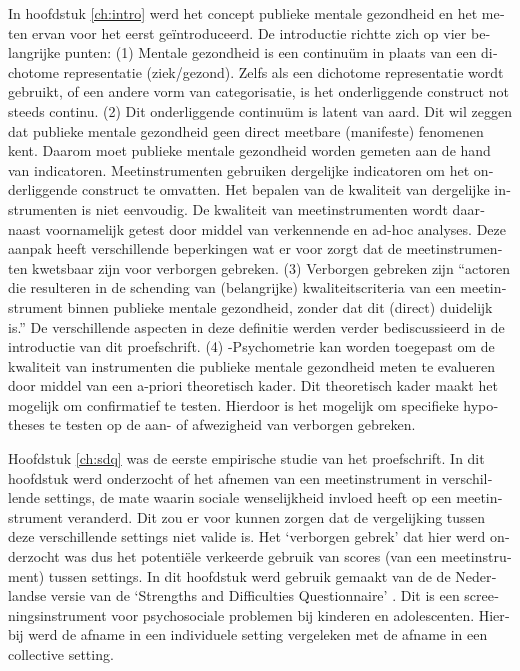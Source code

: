 \begin{otherlanguage}{dutch}
In hoofdstuk \ref{ch:intro} werd het concept publieke mentale gezondheid en het meten ervan voor het eerst ge\"introduceerd. De introductie richtte zich op vier belangrijke punten: (1) Mentale gezondheid is een continu\"um in plaats van een dichotome representatie (ziek/gezond). Zelfs als een dichotome representatie wordt gebruikt, of een andere vorm van categorisatie, is het onderliggende construct not steeds continu. (2) Dit onderliggende continu\"um is latent van aard. Dit wil zeggen dat publieke mentale gezondheid geen direct meetbare (manifeste) fenomenen kent. Daarom moet publieke mentale gezondheid worden gemeten aan de hand van indicatoren. Meetinstrumenten gebruiken dergelijke indicatoren om het onderliggende construct te omvatten. Het bepalen van de kwaliteit van dergelijke instrumenten is niet eenvoudig. De kwaliteit van meetinstrumenten wordt daarnaast voornamelijk getest door middel van verkennende en ad-hoc analyses. Deze aanpak heeft verschillende beperkingen wat er voor zorgt dat de meetinstrumenten kwetsbaar zijn voor verborgen gebreken. (3) Verborgen gebreken zijn ``actoren die resulteren in de schending van (belangrijke) kwaliteitscriteria van een meetinstrument binnen publieke mentale gezondheid, zonder dat dit (direct) duidelijk is.'' De verschillende aspecten in deze definitie werden verder bediscussieerd in de introductie van dit proefschrift. (4) \textbeta-Psychometrie kan worden toegepast om de kwaliteit van instrumenten die publieke mentale gezondheid meten te evalueren door middel van een a-priori theoretisch kader. Dit theoretisch kader maakt het mogelijk om confirmatief te testen. Hierdoor is het mogelijk om specifieke hypotheses te testen op de aan- of afwezigheid van verborgen gebreken.

Hoofdstuk \ref{ch:sdq} was de eerste empirische studie van het proefschrift. In dit hoofdstuk werd onderzocht of het afnemen van een meetinstrument in verschillende settings, de mate waarin sociale wenselijkheid invloed heeft op een meetinstrument veranderd. Dit zou er voor kunnen zorgen dat de vergelijking tussen deze verschillende settings niet valide is. Het `verborgen gebrek' dat hier werd onderzocht was dus het potenti\"ele verkeerde gebruik van scores (van een meetinstrument) tussen settings. In dit hoofdstuk werd gebruik gemaakt van de de Nederlandse versie van de `Strengths and Difficulties Questionnaire' \parencite[SDQ;][]{Goodman_1997}. Dit is een screeningsinstrument voor psychosociale problemen bij kinderen en adolescenten. Hierbij werd de afname in een individuele setting vergeleken met de afname in een collective setting.


\end{otherlanguage}
